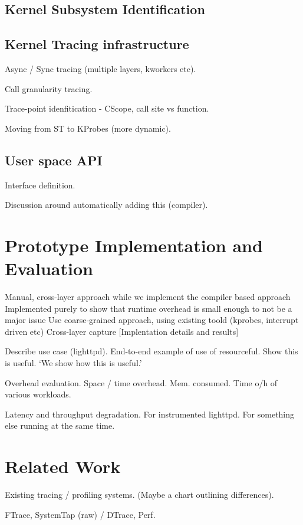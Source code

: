 \documentclass[letterpaper,twocolumn,10pt]{article}
\begin{document}
\subsection{Kernel Subsystem Identification}
\subsection{Kernel Tracing infrastructure}
Async / Sync tracing (multiple layers, kworkers etc).

Call granularity tracing.

Trace-point idenfitication - CScope, call site vs function.

Moving from ST to KProbes (more dynamic).

\subsection{User space API}
Interface definition.

Discussion around automatically adding this (compiler).	

\section{Prototype Implementation and Evaluation}
Manual, cross-layer approach while we implement the compiler based approach
Implemented purely to show that runtime overhead is small enough to not be a major issue
Use coarse-grained approach, using existing toold (kprobes, interrupt driven etc)
Cross-layer capture
[Implentation details and results]

Describe use case (lighttpd).\newline
End-to-end example of use of resourceful. Show this is useful. `We show how this
is useful.'

Overhead evaluation.\newline
Space / time overhead. Mem. consumed. Time o/h of various workloads.

Latency and throughput degradation.\newline
For instrumented lighttpd. For something else running at the same time.


\section{Related Work}
Existing tracing / profiling systems. (Maybe a chart outlining differences).

FTrace, SystemTap (raw) / DTrace, Perf.
\end{document}
